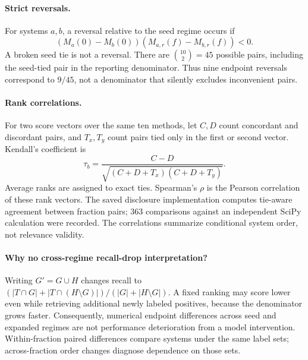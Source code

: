 \documentclass{article}
\begin{document}
\paragraph{Strict reversals.}
For systems $a,b$, a reversal relative to the seed regime occurs if
\begin{equation}
 (M_a(0)-M_b(0))(M_{a,r}(f)-M_{b,r}(f))<0.
\end{equation}
A broken seed tie is not a reversal. There are $\binom{10}{2}=45$ possible pairs, including the seed-tied pair in the reporting denominator. Thus nine endpoint reversals correspond to $9/45$, not a denominator that silently excludes inconvenient pairs.

\paragraph{Rank correlations.}
For two score vectors over the same ten methods, let $C,D$ count concordant and discordant pairs, and $T_x,T_y$ count pairs tied only in the first or second vector. Kendall's coefficient is
\begin{equation}
 \tau_b=\frac{C-D}{\sqrt{(C+D+T_x)(C+D+T_y)}}.
\end{equation}
Average ranks are assigned to exact ties. Spearman's $\rho$ is the Pearson correlation of these rank vectors. The saved disclosure implementation computes tie-aware agreement between fraction pairs; 363 comparisons against an independent SciPy calculation were recorded. The correlations summarize conditional system order, not relevance validity.

\paragraph{Why no cross-regime recall-drop interpretation?}
Writing $G'=G\cup H$ changes recall to $(|T\cap G|+|T\cap(H\setminus G)|)/(|G|+|H\setminus G|)$. A fixed ranking may score lower even while retrieving additional newly labeled positives, because the denominator grows faster. Consequently, numerical endpoint differences across seed and expanded regimes are not performance deterioration from a model intervention. Within-fraction paired differences compare systems under the same label sets; across-fraction order changes diagnose dependence on those sets.
\end{document}

